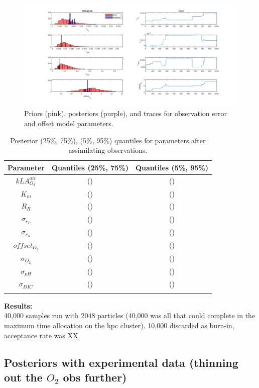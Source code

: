 \documentclass{ruthesis}
\begin{document}
\begin{figure}
	\centerline{\includegraphics[width=1.3\textwidth]{images_microalgae/plots_chris_offset_sigma/sigmas}}
	\caption[.]{Priors (pink), posteriors (purple), and traces for observation error and offset model parameters.}
	\label{fig:micro_exp_offset_sigma_sigmas}
\end{figure}



\begin{longtable}{|c|c|c|} 
	\hline
	\bfseries{Parameter}  & \bfseries{Quantiles (25\%, 75\%)}  & \bfseries{Quantiles (5\%, 95\%)} \\ \hline
	$kLA_{O_2}^{air}$ 	& ()  		& ()   		\\
	$K_m$ 				& () 		& () 	 	\\ 
	$R_R$ 				& () 		& () 		 \\
	$\sigma_{r_P}$ 		& () 		& () 		 \\ 
	$\sigma_{r_R}$ 		& () 		& ()		 \\ 
	$offset_{O_2}$ 		& () 		& ()		 \\ 
	$\sigma_{O_2}$ 		& () 		& ()		 \\ 
	$\sigma_{pH}$ 		& () 		& ()		 \\ 
	$\sigma_{DIC}$ 		& () 		& ()		 \\ 	
	\hline
	\caption[.]{Posterior (25\%, 75\%), (5\%, 95\%) quantiles for parameters after assimilating observations.}	
	\label{table:micro_exp_offset_sigma_parameters_table}
\end{longtable}

\textbf{Results:}\\
40,000 samples run with 2048 particles (40,000 was all that could complete in the maximum time allocation on the hpc cluster). 10,000 discarded as burn-in, acceptance rate was XX.




\FloatBarrier
\subsection{Posteriors with experimental data (thinning out the $O_2$ obs further)}
\end{document}
